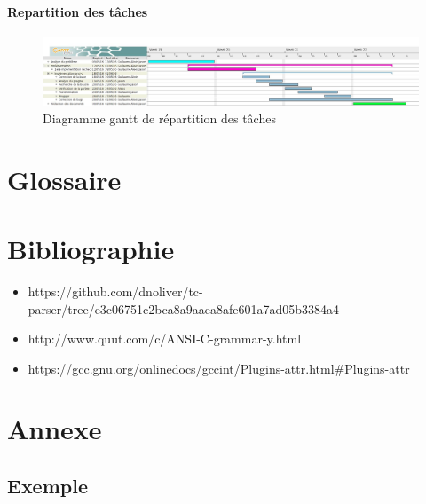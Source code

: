 \documentclass{article}
\begin{document}
	\paragraph{Repartition des tâches}
\begin{figure}[h!]
		\hspace*{-1.18in}
		\includegraphics[scale=0.345]{Gantt/ganttPrev.jpg}
		\caption[Diagramme gantt de répartition des tâches]{Diagramme gantt de répartition des tâches}

  		\label{fig:gantt}
\end{figure}
	
\newpage
	
	
	
\printglossaries


\listoffigures



\section*{Glossaire}
\renewcommand{\glossarysection}[2][]{}

\printglossary[title=List of Terms,toctitle=Terms and abbreviations]



\section*{Bibliographie}
\begin{itemize}

\item https://github.com/dnoliver/tc-parser/tree/e3c06751c2bca8a9aaea8afe601a7ad05b3384a4
\item http://www.quut.com/c/ANSI-C-grammar-y.html
\item https://gcc.gnu.org/onlinedocs/gccint/Plugins-attr.html\#Plugins-attr

\end{itemize}
	

\newpage
	\section{Annexe}

	\subsection{Exemple}
\end{document}
